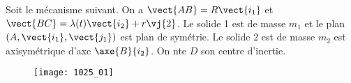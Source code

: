 \normaltrue
\correctionfalse


\setcounter{question}{0}%



\ifcorrection
\else
{}
\fi

\ifprof
\else
Soit le mécanisme suivant. On a $\vect{AB}=R\vect{i_1}$ et $\vect{BC}=\lambda(t)\vect{i_2}+r\vj{2}$. Le solide 1 est de masse $m_1$ et le plan $\left(A,\vect{i_1},\vect{j_1}\right)$ est plan de symétrie. Le solide 2 est de masse $m_2$ est axisymétrique d'axe $\axe{B}{i_2}$. On nte $D$ son centre d'inertie.
\begin{figure}[H]
\texttt{[image: 1025\_01]}
\end{figure}
\fi

\ifprof~\\
\else
\fi

\ifprof~\\
\else
\fi

\ifprof~\\
\else
\fi


\ifprof
\else
{}
\fi